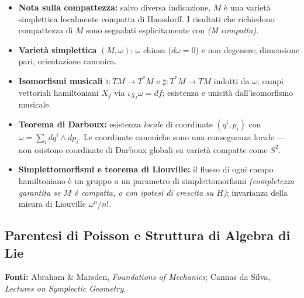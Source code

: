 \documentclass[12pt, a4paper]{article}
\newcommand{\fonti}[1]{%
	\begin{fontebox}
		\textcolor{fontecolor}{\footnotesize\textbf{Fonti:} #1}
	\end{fontebox}%
}
\begin{document}
	\begin{itemize}
		\item \textbf{Nota sulla compattezza:} salvo diversa indicazione, $M$ è una
		varietà simplettica localmente compatta di Hausdorff. I risultati che richiedono
		compattezza di $M$ sono segnalati esplicitamente con \emph{(M compatta)}.
		\item \textbf{Varietà simplettica} $(M,\omega)$: $\omega$ chiusa ($d\omega=0$) e
		non degenere; dimensione pari, orientazione canonica.
		\item \textbf{Isomorfismi musicali} $\flat:TM\to T^*M$ e $\sharp:T^*M\to TM$
		indotti da $\omega$; campi vettoriali hamiltoniani $X_f$ via $\iota_{X_f}\omega=df$;
		esistenza e unicità dall'isomorfismo musicale.
		\item \textbf{Teorema di Darboux:} esistenza \emph{locale} di coordinate
		$(q^i,p_i)$ con $\omega=\sum_i dq^i\wedge dp_i$. Le coordinate canoniche sono
		una conseguenza locale --- non esistono coordinate di Darboux globali su varietà
		compatte come $S^2$.
		\item \textbf{Simplettomorfismi e teorema di Liouville:} il flusso di ogni campo
		hamiltoniano è un gruppo a un parametro di simplettomorfismi \emph{(completezza
			garantita se $M$ è compatta, o con ipotesi di crescita su $H$)}; invarianza
		della misura di Liouville $\omega^n/n!$.
	\end{itemize}
	
	\subsection{Parentesi di Poisson e Struttura di Algebra di Lie}
	
	\fonti{Abraham \& Marsden, \textit{Foundations of Mechanics};
		Cannas da Silva, \textit{Lectures on Symplectic Geometry}.}
	
\end{document}

